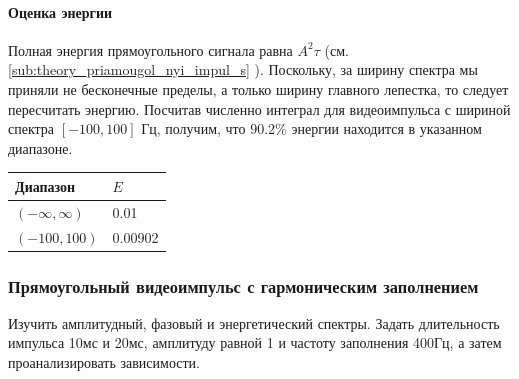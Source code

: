 \paragraph{Оценка энергии}%
\label{par:otsenka_energii}


Полная энергия прямоугольного сигнала равна $A^2 \tau$  (см.
\ref{sub:theory_priamougol_nyi_impul_s} ). Поскольку, за ширину спектра мы
приняли не бесконечные пределы, а только ширину главного лепестка, то следует
пересчитать энергию. Посчитав численно интеграл для видеоимпульса с шириной
спектра $[-100, 100] \text{ Гц}$, получим, что $90.2 \%$ энергии находится в указанном
диапазоне. 


\begin{table}[H]
    \centering
    \begin{tabular}{|l|l|}
    \hline
     Диапазон & $E$ \\ \hline
     $(-\infty, \infty)$&  0.01 \\ \hline
     $(-100, 100)$&  0.00902 \\ \hline
    \end{tabular}
\end{table}

\subsubsection{Прямоугольный видеоимпульс с гармоническим заполнением}

Изучить амплитудный, фазовый и энергетический спектры. Задать
длительность импульса 10мс и 20мс, амплитуду равной 1 и частоту
заполнения 400Гц, а затем проанализировать зависимости.

